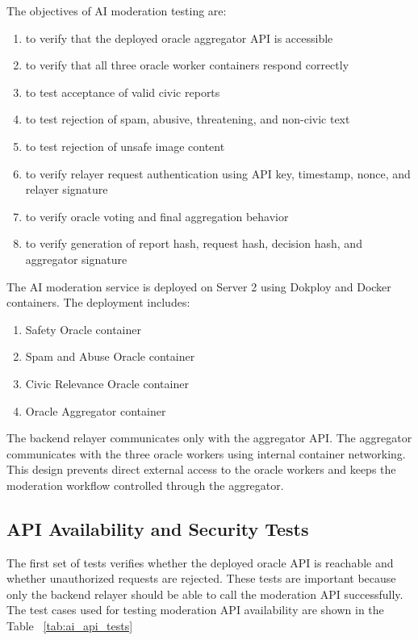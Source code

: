 The objectives of AI moderation testing are:

\begin{enumerate}
    \item to verify that the deployed oracle aggregator API is accessible
    \item to verify that all three oracle worker containers respond correctly
    \item to test acceptance of valid civic reports
    \item to test rejection of spam, abusive, threatening, and non-civic text
    \item to test rejection of unsafe image content
    \item to verify relayer request authentication using API key, timestamp, nonce,
    and relayer signature
    \item to verify oracle voting and final aggregation behavior
    \item to verify generation of report hash, request hash, decision hash, and
    aggregator signature
\end{enumerate}

The AI moderation service is deployed on Server 2 using Dokploy and Docker
containers. The deployment includes:

\begin{enumerate}
    \item Safety Oracle container
    \item Spam and Abuse Oracle container
    \item Civic Relevance Oracle container
    \item Oracle Aggregator container
\end{enumerate}

The backend relayer communicates only with the aggregator API. The aggregator
communicates with the three oracle workers using internal container networking.
This design prevents direct external access to the oracle workers and keeps the
moderation workflow controlled through the aggregator.

\subsection{API Availability and Security Tests}
The first set of tests verifies whether the deployed oracle API is reachable and
whether unauthorized requests are rejected. These tests are important because
only the backend relayer should be able to call the moderation API successfully.
The test cases used for testing moderation API availability are shown in the Table ~\ref{tab:ai_api_tests}

